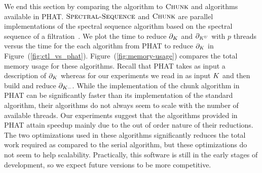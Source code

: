 We end this section by comparing the \mv algorithm to $\textnormal{\scshape Chunk}$ and  algorithms available in PHAT.
$\textnormal{\scshape Spectral-Sequence}$ and $\textnormal{\scshape Chunk}$ are parallel implementations of the spectral sequence algorithm based on the spectral sequence of a filtration~\cite{bkr-cccph-13}.
We plot the time to reduce $\partial_{K}$ and $\partial_{K^U}$ with $p$ threads versus the time for the each algorithm from PHAT to reduce 
$\partial_{K}$ in Figure~(\ref{fig:ctl_vs_phat}). 
Figure~(\ref{fig:memory-usage}) compares the total memory usage for these algorithms. Recall that PHAT takes as input
a description of $\partial_{K}$ whereas for our experiments we read in as input $K$ and then build and reduce $\partial_{K^{\_}}$. 
While the implementation of the chunk algorithm in PHAT can be significantly faster than its implementation of the standard algorithm,
their algorithms do not always seem to scale with the number of available threads. Our experiments suggest that the algorithms 
provided in PHAT attain speedup mainly due to the out of order nature of their reductions. The two optimizations used
in these algorithms significantly reduces the total work required as compared to the serial algorithm, but these optimizations 
do not seem to help scalability.  Practically, this software is still in the early stages of development, so we expect future versions to 
be more competitive.
